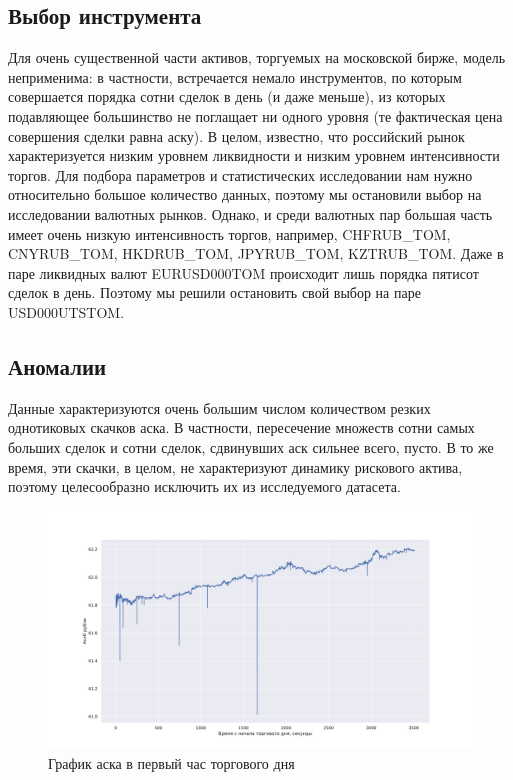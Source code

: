 \subsection{Выбор инструмента}

Для очень существенной части активов, торгуемых на московской бирже, модель неприменима: в частности,
встречается немало инструментов, по которым совершается порядка сотни сделок в день (и даже меньше), из которых подавляющее
большинство не поглащает ни одного уровня (те фактическая цена совершения сделки равна аску). В целом, известно, что российский рынок 
характеризуется низким уровнем ликвидности и низким уровнем интенсивности торгов. Для подбора параметров и статистических исследовании
нам нужно относительно большое количество данных, поэтому мы остановили выбор на исследовании валютных рынков.
Однако, и среди валютных пар большая часть имеет очень низкую интенсивность торгов, например, CHFRUB\_TOM, CNYRUB\_TOM, HKDRUB\_TOM, 
JPYRUB\_TOM, KZTRUB\_TOM.
Даже в паре ликвидных валют EURUSD000TOM происходит лишь порядка пятисот сделок в день. Поэтому мы решили остановить свой выбор на паре
USD000UTSTOM.



\subsection{Аномалии}

Данные характеризуются очень большим числом количеством резких однотиковых скачков аска. В частности, пересечение множеств
сотни самых больших сделок и сотни сделок, сдвинувших аск сильнее всего, пусто. В то же время, эти скачки, в целом, не характеризуют
динамику рискового актива, поэтому целесообразно исключить их из исследуемого датасета.
\begin{figure}
    \includegraphics[scale=0.41]{fig/Palki.pdf}
    \caption{График аска в первый час торгового дня}
    \label{datacsv}
\end{figure}
